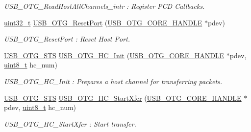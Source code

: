 \begin{DoxyCompactItemize}
\begin{DoxyCompactList}\small\item\em U\-S\-B\-\_\-\-O\-T\-G\-\_\-\-Read\-Host\-All\-Channels\-\_\-intr \-: Register P\-C\-D Callbacks. \end{DoxyCompactList}\item 
\hyperlink{stdint_8h_a435d1572bf3f880d55459d9805097f62}{uint32\-\_\-t} \hyperlink{group___u_s_b___c_o_r_e___private___functions_ga5a4de118aadb6d80eaa378c1f2e0450b}{U\-S\-B\-\_\-\-O\-T\-G\-\_\-\-Reset\-Port} (\hyperlink{group___u_s_b___c_o_r_e___exported___types_gaf76054c11eb8a3367907aad7ae700e80}{U\-S\-B\-\_\-\-O\-T\-G\-\_\-\-C\-O\-R\-E\-\_\-\-H\-A\-N\-D\-L\-E} $\ast$pdev)
\begin{DoxyCompactList}\small\item\em U\-S\-B\-\_\-\-O\-T\-G\-\_\-\-Reset\-Port \-: Reset Host Port. \end{DoxyCompactList}\item 
\hyperlink{group___u_s_b___c_o_r_e___exported___types_ga8b6504b9af0662f17515795db0f9c8ed}{U\-S\-B\-\_\-\-O\-T\-G\-\_\-\-S\-T\-S} \hyperlink{group___u_s_b___c_o_r_e___private___functions_gadea62a86c9f17212910379954f695d00}{U\-S\-B\-\_\-\-O\-T\-G\-\_\-\-H\-C\-\_\-\-Init} (\hyperlink{group___u_s_b___c_o_r_e___exported___types_gaf76054c11eb8a3367907aad7ae700e80}{U\-S\-B\-\_\-\-O\-T\-G\-\_\-\-C\-O\-R\-E\-\_\-\-H\-A\-N\-D\-L\-E} $\ast$pdev, \hyperlink{stdint_8h_aba7bc1797add20fe3efdf37ced1182c5}{uint8\-\_\-t} hc\-\_\-num)
\begin{DoxyCompactList}\small\item\em U\-S\-B\-\_\-\-O\-T\-G\-\_\-\-H\-C\-\_\-\-Init \-: Prepares a host channel for transferring packets. \end{DoxyCompactList}\item 
\hyperlink{group___u_s_b___c_o_r_e___exported___types_ga8b6504b9af0662f17515795db0f9c8ed}{U\-S\-B\-\_\-\-O\-T\-G\-\_\-\-S\-T\-S} \hyperlink{group___u_s_b___c_o_r_e___private___functions_ga88809efa1de4090dc8938c4fb4cff88e}{U\-S\-B\-\_\-\-O\-T\-G\-\_\-\-H\-C\-\_\-\-Start\-Xfer} (\hyperlink{group___u_s_b___c_o_r_e___exported___types_gaf76054c11eb8a3367907aad7ae700e80}{U\-S\-B\-\_\-\-O\-T\-G\-\_\-\-C\-O\-R\-E\-\_\-\-H\-A\-N\-D\-L\-E} $\ast$pdev, \hyperlink{stdint_8h_aba7bc1797add20fe3efdf37ced1182c5}{uint8\-\_\-t} hc\-\_\-num)
\begin{DoxyCompactList}\small\item\em U\-S\-B\-\_\-\-O\-T\-G\-\_\-\-H\-C\-\_\-\-Start\-Xfer \-: Start transfer. \end{DoxyCompactList}\item 

\end{DoxyCompactItemize}
